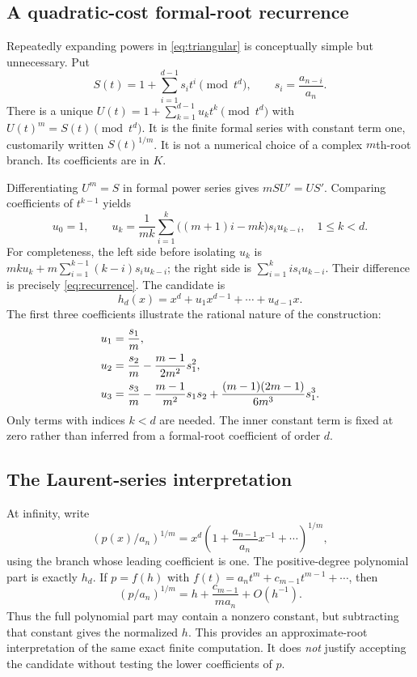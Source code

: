 \documentclass[11pt,a4paper]{article}
\numberwithin{equation}{section}
\theoremstyle{definition}
\theoremstyle{remark}
\begin{document}
\subsection{A quadratic-cost formal-root recurrence}
Repeatedly expanding powers in \eqref{eq:triangular} is conceptually simple
but unnecessary. Put
\begin{equation}
 S(t)=1+\sum_{i=1}^{d-1}s_i t^i\pmod{t^d},
 \qquad s_i=\frac{a_{n-i}}{a_n}.
 \label{eq:S}
\end{equation}
There is a unique $U(t)=1+\sum_{k=1}^{d-1}u_k t^k\pmod{t^d}$ with
$U(t)^m=S(t)\pmod{t^d}$. It is the finite formal series with constant term
one, customarily written $S(t)^{1/m}$. It is not a numerical choice of a
complex $m$th-root branch. Its coefficients are in $K$.

Differentiating $U^m=S$ in formal power series gives
$mSU'=US'$. Comparing coefficients of $t^{k-1}$ yields
\begin{equation}
 \boxed{\quad
 u_0=1,\qquad
 u_k=\frac{1}{mk}\sum_{i=1}^{k}
       \bigl((m+1)i-mk\bigr)s_i u_{k-i},
 \quad 1\le k<d.\quad}
 \label{eq:recurrence}
\end{equation}
For completeness, the left side before isolating $u_k$ is
$mku_k+m\sum_{i=1}^{k-1}(k-i)s_i u_{k-i}$; the right side is
$\sum_{i=1}^k i s_i u_{k-i}$. Their difference is precisely
\eqref{eq:recurrence}. The candidate is
\begin{equation}
 h_d(x)=x^d+u_1x^{d-1}+\cdots+u_{d-1}x.
 \label{eq:hd}
\end{equation}
The first three coefficients illustrate the rational nature of the construction:
\begin{align}
 u_1&=\frac{s_1}{m},\notag\\
 u_2&=\frac{s_2}{m}-\frac{m-1}{2m^2}s_1^2,\notag\\
 u_3&=\frac{s_3}{m}-\frac{m-1}{m^2}s_1s_2
       +\frac{(m-1)(2m-1)}{6m^3}s_1^3.
 \label{eq:firstcoeffs}
\end{align}
Only terms with indices $k<d$ are needed. The inner constant term is fixed
at zero rather than inferred from a formal-root coefficient of order $d$.

\subsection{The Laurent-series interpretation}
At infinity, write
\[
 \left(p(x)/a_n\right)^{1/m}
 =x^d\left(1+\frac{a_{n-1}}{a_n}x^{-1}+\cdots\right)^{1/m},
\]
using the branch whose leading coefficient is one. The positive-degree
polynomial part is exactly $h_d$. If $p=f(h)$ with
$f(t)=a_nt^m+c_{m-1}t^{m-1}+\cdots$, then
\[
 \left(p/a_n\right)^{1/m}
 =h+\frac{c_{m-1}}{ma_n}+O(h^{-1}).
\]
Thus the full polynomial part may contain a nonzero constant, but subtracting
that constant gives the normalized $h$. This provides an approximate-root
interpretation of the same exact finite computation. It does \emph{not}
justify accepting the candidate without testing the lower coefficients of
$p$.
\end{document}
